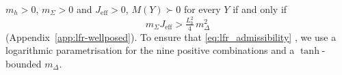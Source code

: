 $m_h>0$, $m_\Sigma>0$ and $J_{\mathrm{eff}}>0$, $M(Y)\succ0$ for every $Y$ if and only if
\begin{equation}
  m_\Sigma J_{\mathrm{eff}}>\tfrac{L_b^2}{4}\,m_\Delta^2
  \label{eq:lfr_admissibility}
\end{equation}
(Appendix~\ref{app:lfr-wellposed}). 
To ensure that \eqref{eq:lfr_admissibility}
, we use a logarithmic parametrisation for
the nine positive combinations and a $\tanh$-bounded $m_\Delta$.
